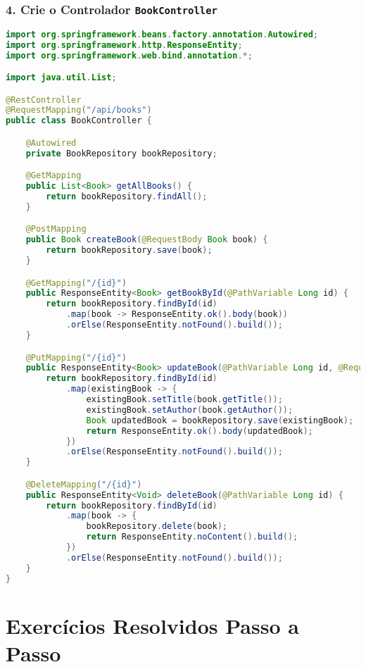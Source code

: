 \documentclass[a4paper,12pt]{book}
\begin{document}
\subsubsection{4. Crie o Controlador \texttt{BookController}}

\begin{lstlisting}[language=Java, caption={Controlador Book}]
import org.springframework.beans.factory.annotation.Autowired;
import org.springframework.http.ResponseEntity;
import org.springframework.web.bind.annotation.*;

import java.util.List;

@RestController
@RequestMapping("/api/books")
public class BookController {

    @Autowired
    private BookRepository bookRepository;

    @GetMapping
    public List<Book> getAllBooks() {
        return bookRepository.findAll();
    }

    @PostMapping
    public Book createBook(@RequestBody Book book) {
        return bookRepository.save(book);
    }

    @GetMapping("/{id}")
    public ResponseEntity<Book> getBookById(@PathVariable Long id) {
        return bookRepository.findById(id)
            .map(book -> ResponseEntity.ok().body(book))
            .orElse(ResponseEntity.notFound().build());
    }

    @PutMapping("/{id}")
    public ResponseEntity<Book> updateBook(@PathVariable Long id, @RequestBody Book book) {
        return bookRepository.findById(id)
            .map(existingBook -> {
                existingBook.setTitle(book.getTitle());
                existingBook.setAuthor(book.getAuthor());
                Book updatedBook = bookRepository.save(existingBook);
                return ResponseEntity.ok().body(updatedBook);
            })
            .orElse(ResponseEntity.notFound().build());
    }

    @DeleteMapping("/{id}")
    public ResponseEntity<Void> deleteBook(@PathVariable Long id) {
        return bookRepository.findById(id)
            .map(book -> {
                bookRepository.delete(book);
                return ResponseEntity.noContent().build();
            })
            .orElse(ResponseEntity.notFound().build());
    }
}
\end{lstlisting}

\section{Exercícios Resolvidos Passo a Passo}
\end{document}
